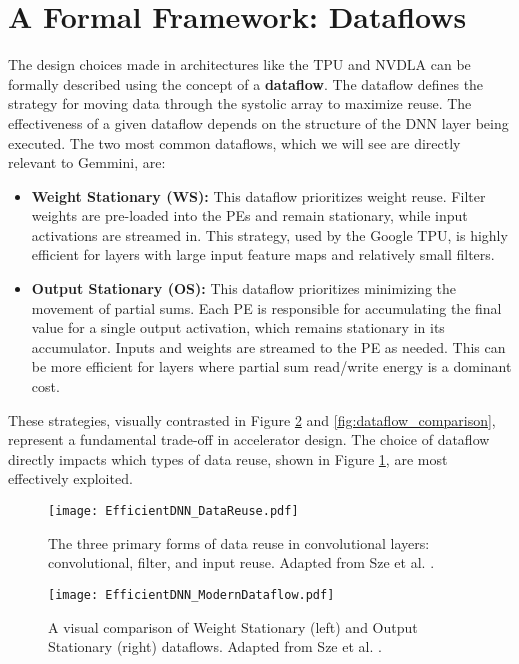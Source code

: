 \section{A Formal Framework: Dataflows}
\label{sec:formal_dataflows}
The design choices made in architectures like the TPU and NVDLA can be formally described using the concept of a \textbf{dataflow}. The dataflow defines the strategy for moving data through the systolic array to maximize reuse. The effectiveness of a given dataflow depends on the structure of the DNN layer being executed. The two most common dataflows, which we will see are directly relevant to Gemmini, are:
\begin{itemize}
    \item \textbf{Weight Stationary (WS):} This dataflow prioritizes weight reuse. Filter weights are pre-loaded into the PEs and remain stationary, while input activations are streamed in. This strategy, used by the Google TPU, is highly efficient for layers with large input feature maps and relatively small filters.
    \item \textbf{Output Stationary (OS):} This dataflow prioritizes minimizing the movement of partial sums. Each PE is responsible for accumulating the final value for a single output activation, which remains stationary in its accumulator. Inputs and weights are streamed to the PE as needed. This can be more efficient for layers where partial sum read/write energy is a dominant cost.
\end{itemize}
These strategies, visually contrasted in Figure \ref{fig:dataflow_taxonomy} and \ref{fig:dataflow_comparison}, represent a fundamental trade-off in accelerator design. The choice of dataflow directly impacts which types of data reuse, shown in Figure \ref{fig:dnn_reuse}, are most effectively exploited.

\begin{figure}[htbp]
    \centering
    \texttt{[image: EfficientDNN\_DataReuse.pdf]} 
    \caption[Data Reuse Opportunities in DNNs]{The three primary forms of data reuse in convolutional layers: convolutional, filter, and input reuse. Adapted from Sze et al. \cite{sze2020efficient}.}
    \label{fig:dnn_reuse}
\end{figure}

\begin{figure}[htbp]
    \centering
    \texttt{[image: EfficientDNN\_ModernDataflow.pdf]} 
    \caption[Taxonomy of Common DNN Dataflows]{A visual comparison of Weight Stationary (left) and Output Stationary (right) dataflows. Adapted from Sze et al. \cite{sze2020efficient}.}
    \label{fig:dataflow_taxonomy}
\end{figure}

